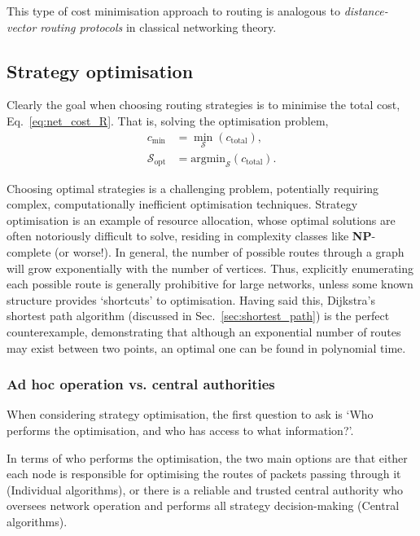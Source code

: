 \documentclass[aps,rmp,twocolumn,amsmath,amssymb,nofootinbib,superscriptaddress,longbibliography,floatfix]{revtex4-1}
\begin{document}
This type of cost minimisation approach to routing is analogous to \emph{distance-vector routing protocols} in classical networking theory.

%
%

\subsection{Strategy optimisation} \label{sec:strat_opt}

Clearly the goal when choosing routing strategies is to minimise the total cost, Eq.~\ref{eq:net_cost_R}. That is, solving the optimisation problem,
\begin{align}
c_\mathrm{min} &= \min_\mathcal{S} (c_\mathrm{total}), \nonumber \\
\mathcal{S}_\mathrm{opt} &= \mathrm{argmin}_\mathcal{S} (c_\mathrm{total}).
\end{align}

Choosing optimal strategies is a challenging problem, potentially requiring complex, computationally inefficient optimisation techniques. Strategy optimisation is an example of resource allocation, whose optimal solutions are often notoriously difficult to solve, residing in complexity classes like \textbf{NP}-complete (or worse!). In general, the number of possible routes through a graph will grow exponentially with the number of vertices. Thus, explicitly enumerating each possible route is generally prohibitive for large networks, unless some known structure provides `shortcuts' to optimisation. Having said this, Dijkstra's shortest path algorithm (discussed in Sec.~\ref{sec:shortest_path}) is the perfect counterexample, demonstrating that although an exponential number of routes may exist between two points, an optimal one can be found in polynomial time.

%
%

\subsubsection{Ad hoc operation vs. central authorities}

When considering strategy optimisation, the first question to ask is `Who performs the optimisation, and who has access to what information?'.

In terms of who performs the optimisation, the two main options are that either each node is responsible for optimising the routes of packets passing through it ({\sc Individual} algorithms), or there is a reliable and trusted central authority who oversees network operation and performs all strategy decision-making ({\sc Central} algorithms).
\end{document}
